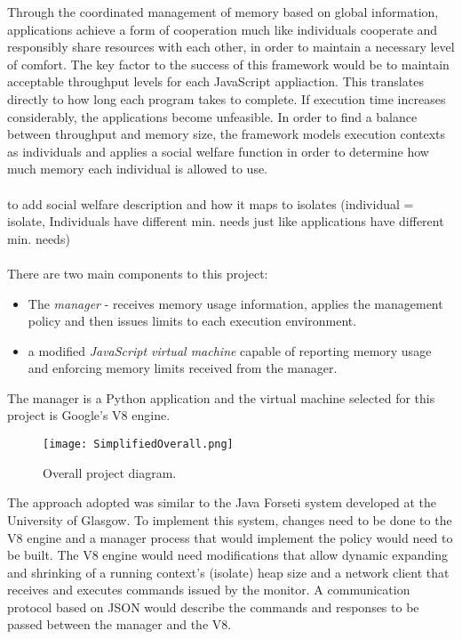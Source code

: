 \documentclass{l4proj}
\begin{document}
\hspace*{3em} Through the coordinated management of memory based on global information, applications achieve a form of cooperation much like individuals cooperate and responsibly share resources with each other, in order to maintain a necessary level of comfort. The key factor to the success of this framework would be to maintain acceptable throughput levels for each JavaScript appliaction. This translates directly to how long each program takes to complete. If execution time increases considerably, the applications become unfeasible. In order to find a balance between throughput and memory size, the framework models execution contexts as individuals and applies a social welfare function in order to determine how much memory each individual is allowed to use.
\\\\%
to add social welfare description and how it maps to isolates (individual = isolate, Individuals have different min. needs just like applications have different min. needs)
\\\\
There are two main components to this project:
\begin{itemize}
\item The \textit{manager} - receives memory usage information, applies the management policy and then issues limits to each execution environment.
\item a modified \textit{JavaScript virtual machine} capable of reporting memory usage and enforcing memory limits received from the manager.
\end{itemize}
The manager is a Python application and the virtual machine selected for this project is Google's V8 engine.
\begin{figure}[!ht]
  \caption{Overall project diagram.}
  \centering
    \texttt{[image: SimplifiedOverall.png]}
\end{figure}

The approach adopted was similar to the Java Forseti system developed at the University of Glasgow\cite{forseti}. To implement this system, changes need to be done to the V8 engine and a manager process that would implement the policy would need to be built. The V8 engine would need modifications that allow dynamic expanding and shrinking of a running context's (isolate) heap size and a network client that receives and executes commands issued by the monitor. A communication protocol based on JSON would describe the commands and responses to be passed between the manager and the V8. %
\end{document}
